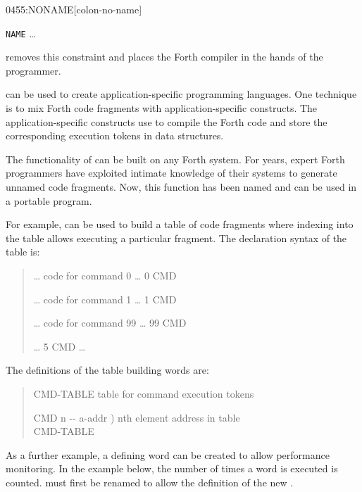 \begin{worddef}{0455}{:NONAME}[colon-no-name]
\begin{rationale}
		\tab \word{:} \texttt{NAME} {\ldots} \word{;}

		 removes this constraint and places the Forth
		compiler in the hands of the programmer.

		 can be used to create application-specific
		programming languages. One technique is to mix Forth code
		fragments with application-specific constructs. The
		application-specific constructs use  to compile
		the Forth code and store the corresponding execution tokens
		in data structures.

		The functionality of  can be built on any Forth
		system. For years, expert Forth programmers have exploited
		intimate knowledge of their systems to generate unnamed code
		fragments. Now, this function has been named and can be used
		in a portable program.

		For example,  can be used to build a table of
		code fragments where indexing into the table allows executing
		a particular fragment. The declaration syntax of the table is:

		\begin{quote}\ttfamily
			 {\ldots} code for command 0 {\ldots} \word{;}
			0 CMD \word{!}

			 {\ldots} code for command 1 {\ldots} \word{;}
			1 CMD \word{!}

			\tab {\ldots}

			 {\ldots} code for command 99 {\ldots} \word{;}
			99 CMD \word{!}

			{\ldots} 5 CMD   {\ldots}
		\end{quote}

		The definitions of the table building words are:

		\begin{quote}\ttfamily
			 CMD-TABLE
				 table for command execution tokens \\
			  

			\word{:} CMD  n -{}- a-addr )
				 nth element address in table \\
			\tab {} CMD-TABLE \word{+}
			\word{;}
		\end{quote}

		As a further example, a defining word can be created to allow
		performance monitoring. In the example below, the number of
		times a word is executed is counted. \word{:} must first be
		renamed to allow the definition of the new \word{;}.


\end{rationale}
\end{worddef}

